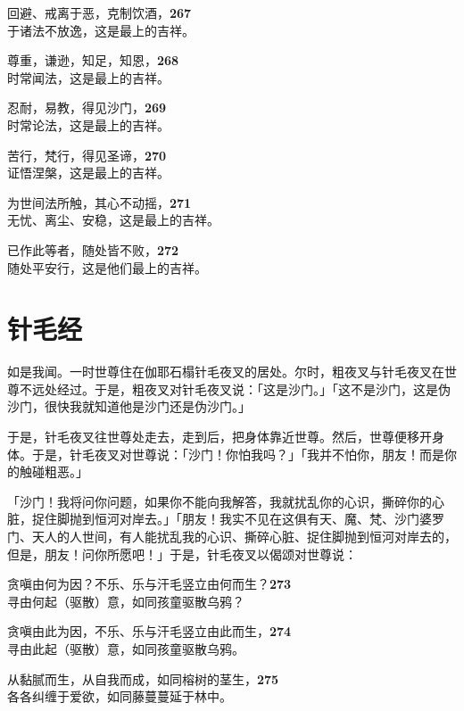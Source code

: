 回避、戒离于恶，克制饮酒，\hfill{\grayfootnotesize \textbf{267}} \\
于诸法不放逸，这是最上的吉祥。


尊重，谦逊，知足，知恩，\hfill{\grayfootnotesize \textbf{268}} \\
时常闻法，这是最上的吉祥。


忍耐，易教，得见沙门，\hfill{\grayfootnotesize \textbf{269}} \\
时常论法，这是最上的吉祥。


苦行，梵行，得见圣谛，\hfill{\grayfootnotesize \textbf{270}} \\
证悟涅槃，这是最上的吉祥。


为世间法所触，其心不动摇，\hfill{\grayfootnotesize \textbf{271}} \\
无忧、离尘、安稳，这是最上的吉祥。


已作此等者，随处皆不败，\hfill{\grayfootnotesize \textbf{272}} \\
随处平安行，这是他们最上的吉祥。


\section{针毛经}

如是我闻。一时世尊住在伽耶石榻针毛夜叉的居处。尔时，粗夜叉与针毛夜叉在世尊不远处经过。于是，粗夜叉对针毛夜叉说：「这是沙门。」「这不是沙门，这是伪沙门，很快我就知道他是沙门还是伪沙门。」


于是，针毛夜叉往世尊处走去，走到后，把身体靠近世尊。然后，世尊便移开身体。于是，针毛夜叉对世尊说：「沙门！你怕我吗？」「我并不怕你，朋友！而是你的触碰粗恶。」


「沙门！我将问你问题，如果你不能向我解答，我就扰乱你的心识，撕碎你的心脏，捉住脚抛到恒河对岸去。」「朋友！我实不见在这俱有天、魔、梵、沙门婆罗门、天人的人世间，有人能扰乱我的心识、撕碎心脏、捉住脚抛到恒河对岸去的，但是，朋友！问你所愿吧！」于是，针毛夜叉以偈颂对世尊说：


贪嗔由何为因？不乐、乐与汗毛竖立由何而生？\hfill{\grayfootnotesize \textbf{273}} \\
寻由何起（驱散）意，如同孩童驱散乌鸦？


贪嗔由此为因，不乐、乐与汗毛竖立由此而生，\hfill{\grayfootnotesize \textbf{274}} \\
寻由此起（驱散）意，如同孩童驱散乌鸦。


从黏腻而生，从自我而成，如同榕树的茎生，\hfill{\grayfootnotesize \textbf{275}} \\
各各纠缠于爱欲，如同藤蔓蔓延于林中。


